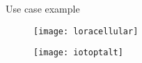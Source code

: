 \begin{frame}{Use case example}

  \begin{figure}
    \centering
    \texttt{[image: loracellular]}
  \end{figure}

  \begin{figure}
    \centering
    \texttt{[image: iotoptalt]}
  \end{figure}

\end{frame}